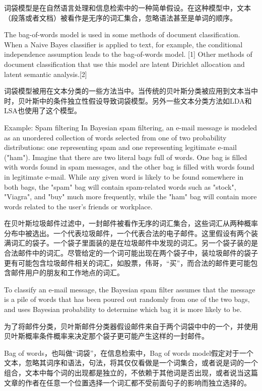 \documentclass[10pt,a4paper]{ctexbook}
\begin{document}
   词袋模型是在自然语言处理和信息检索中的一种简单假设。在这种模型中，文本（段落或者文档）被看作是无序的词汇集合，忽略语法甚至是单词的顺序。


   The bag-of-words model is used in some methods of document classification. When a Naive Bayes classifier is applied to text, for example, the conditional independence assumption leads to the bag-of-words model. [1] Other methods of document classification that use this model are latent Dirichlet allocation and latent semantic analysis.[2]

   词袋模型被用在文本分类的一些方法当中。当传统的贝叶斯分类被应用到文本当中时，贝叶斯中的条件独立性假设导致词袋模型。另外一些文本分类方法如LDA和LSA也使用了这个模型。

  
   Example: Spam filtering 
   In Bayesian spam filtering, an e-mail message is modeled as an unordered collection of words selected from one of two probability distributions: one representing spam and one representing legitimate e-mail ("ham"). Imagine that there are two literal bags full of words. One bag is filled with words found in spam messages, and the other bag is filled with words found in legitimate e-mail. While any given word is likely to be found somewhere in both bags, the "spam" bag will contain spam-related words such as "stock", "Viagra", and "buy" much more frequently, while the "ham" bag will contain more words related to the user's friends or workplace. 

   在贝叶斯垃圾邮件过滤中，一封邮件被看作无序的词汇集合，这些词汇从两种概率分布中被选出。一个代表垃圾邮件，一个代表合法的电子邮件。这里假设有两个装满词汇的袋子。一个袋子里面装的是在垃圾邮件中发现的词汇。另一个袋子装的是合法邮件中的词汇。尽管给定的一个词可能出现在两个袋子中，装垃圾邮件的袋子更有可能包含垃圾邮件相关的词汇，如股票，伟哥，“买”，而合法的邮件更可能包含邮件用户的朋友和工作地点的词汇。


    To classify an e-mail message, the Bayesian spam filter assumes that the message is a pile of words that has been poured out randomly from one of the two bags, and uses Bayesian probability to determine which bag it is more likely to be.

    为了将邮件分类，贝叶斯邮件分类器假设邮件来自于两个词袋中中的一个，并使用贝叶斯概率条件概率来决定那个袋子更可能产生这样的一封邮件。



   Bag of words，也叫做“词袋”，在信息检索中，Bag of words model假定对于一个文本，忽略其词序和语法，句法，将其仅仅看做是一个词集合，或者说是词的一个组合，文本中每个词的出现都是独立的，不依赖于其他词是否出现，或者说当这篇文章的作者在任意一个位置选择一个词汇都不受前面句子的影响而独立选择的。
        
\end{document}
